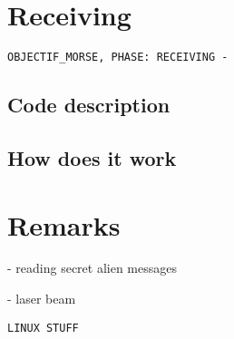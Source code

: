 \documentclass[12pt]{report}
\begin{document}
\newpage

\chapter{Receiving}

\verb|OBJECTIF_MORSE, PHASE: RECEIVING -|


\section{Code description}


\section{How does it work}


\chapter{Remarks}

- reading secret alien messages

- laser beam



\begin{snugshade}
\begin{verbatim}
LINUX STUFF
\end{verbatim}
\end{snugshade}


\begin{thebibliography}{50}

\end{thebibliography}
\end{document}
